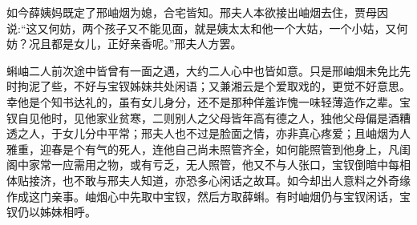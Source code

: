 \begin{parag}
    如今薛姨妈既定了邢岫烟为媳，合宅皆知。邢夫人本欲接出岫烟去住，贾母因说:“这又何妨，两个孩子又不能见面，就是姨太太和他一个大姑，一个小姑，又何妨？况且都是女儿，正好亲香呢。”邢夫人方罢。
\end{parag}


\begin{parag}
    蝌岫二人前次途中皆曾有一面之遇，大约二人心中也皆如意。只是邢岫烟未免比先时拘泥了些，不好与宝钗姊妹共处闲语；又兼湘云是个爱取戏的，更觉不好意思。幸他是个知书达礼的，虽有女儿身分，还不是那种佯羞诈愧一味轻薄造作之辈。宝钗自见他时，见他家业贫寒，二则别人之父母皆年高有德之人，独他父母偏是酒糟透之人，于女儿分中平常；邢夫人也不过是脸面之情，亦非真心疼爱；且岫烟为人雅重，迎春是个有气的死人，连他自己尚未照管齐全，如何能照管到他身上，凡闺阁中家常一应需用之物，或有亏乏，无人照管，他又不与人张口，宝钗倒暗中每相体贴接济，也不敢与邢夫人知道，亦恐多心闲话之故耳。如今却出人意料之外奇缘作成这门亲事。岫烟心中先取中宝钗，然后方取薛蝌。有时岫烟仍与宝钗闲话，宝钗仍以姊妹相呼。
\end{parag}


